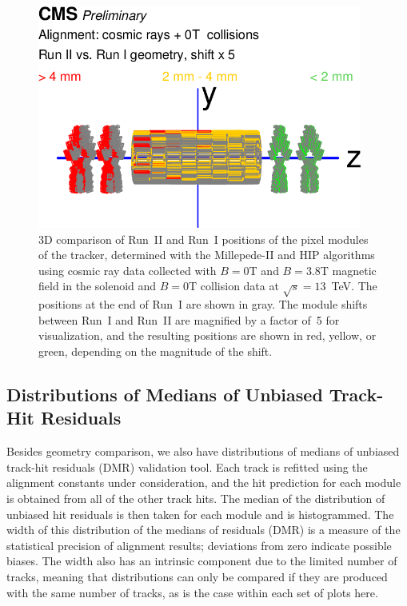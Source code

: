 \begin{figure}[htb]
    \begin{center}
        \includegraphics[width=0.95\textwidth]{../figs/Alignment/AlRes_RunIIvsRunI.png}
    \end{center}
    \caption{3D comparison of Run~II and Run~I positions of the pixel modules of the tracker, determined with the Millepede-II and HIP algorithms using cosmic ray data collected with $B=0$T and $B=3.8$T magnetic field in the solenoid and $B=0$T collision data at $\sqrt{s}=13$~TeV. The positions at the end of Run~I are shown in gray. The module shifts between Run~I and Run~II are magnified by a factor of~5 for visualization, and the resulting positions are shown in red, yellow, or green, depending on the magnitude of the shift. }
    \label{fig:GCP_3D}
\end{figure}

\subsection{Distributions of Medians of Unbiased Track-Hit Residuals}
\label{sec:AlRes_DMRs}

Besides geometry comparison, we also have distributions of medians of unbiased track-hit residuals (DMR) validation tool. Each track is refitted using the alignment constants under consideration, and the hit prediction for each module is obtained from all of the other track hits. The median of the distribution of unbiased hit residuals is then taken for each module and is histogrammed. The width of this distribution of the medians of residuals (DMR) is a measure of the statistical precision of alignment results; deviations from zero indicate possible biases. The width also has an intrinsic component due to the limited number of tracks, meaning that distributions can only be compared if they are produced with the same number of tracks, as is the case within each set of plots here. 

